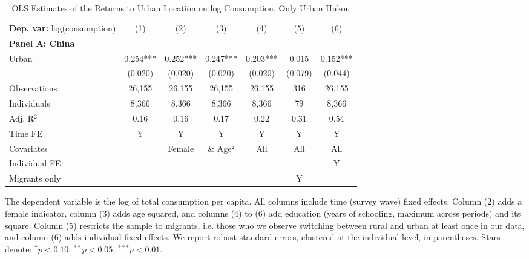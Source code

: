 \begin{table}[htbp] \centering \begin{threeparttable}
 \caption{OLS Estimates of the Returns to Urban Location on log Consumption, Only Urban Hukou} 
 \label{tab:OLS_CHN_hukou_urban_only_consumption_urban_unb} 
\begin{tabular}{l cccccc} \toprule  \textbf{Dep. var:}  log(consumption) 
                    &\multicolumn{1}{c}{(1)}   &\multicolumn{1}{c}{(2)}   &\multicolumn{1}{c}{(3)}   &\multicolumn{1}{c}{(4)}   &\multicolumn{1}{c}{(5)}   &\multicolumn{1}{c}{(6)}   \\
\textbf{Panel A: China} \\
Urban               &       0.254***&       0.252***&       0.247***&       0.203***&       0.015   &       0.152***\\
                    &     (0.020)   &     (0.020)   &     (0.020)   &     (0.020)   &     (0.079)   &     (0.044)   \\
\addlinespace
Observations        &      26,155   &      26,155   &      26,155   &      26,155   &         316   &      26,155   \\
Individuals         &       8,366   &       8,366   &       8,366   &       8,366   &          79   &       8,366   \\
Adj. R$^{2}$        &        0.16   &        0.16   &        0.17   &        0.22   &        0.31   &        0.54   \\
\cmidrule{2 -7} Time FE & Y & Y & Y & Y & Y & Y \\ Covariates & & Female & \& Age$^2$ & All & All & All \\ Individual FE & & & & & & Y \\ Migrants only & & & & & Y & \\ \bottomrule \end{tabular} \begin{tablenotes}[flushleft] \footnotesize \item{The dependent variable is the log of total consumption per capita. All columns include time (survey wave) fixed effects. Column (2) adds a female indicator, column (3) adds age squared, and columns (4) to (6) add education (years of schooling, maximum across periods) and its square. Column (5) restricts the sample to migrants, i.e. those who we observe switching between rural and urban at least once in our data, and column (6) adds individual fixed effects. We report robust standard errors, clustered at the individual level, in parentheses. Stars denote: $^{*} p<0.10$; $^{**} p<0.05$; $^{***} p<0.01$.} \end{tablenotes} \end{threeparttable} \end{table}
